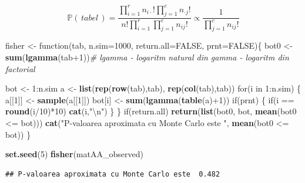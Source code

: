 \documentclass[]{article}
\newenvironment{Shaded}{\begin{snugshade}}{\end{snugshade}}
\newcommand{\KeywordTok}[1]{\textcolor[rgb]{0.13,0.29,0.53}{\textbf{{#1}}}}
\newcommand{\DataTypeTok}[1]{\textcolor[rgb]{0.13,0.29,0.53}{{#1}}}
\newcommand{\DecValTok}[1]{\textcolor[rgb]{0.00,0.00,0.81}{{#1}}}
\newcommand{\CharTok}[1]{\textcolor[rgb]{0.31,0.60,0.02}{{#1}}}
\newcommand{\StringTok}[1]{\textcolor[rgb]{0.31,0.60,0.02}{{#1}}}
\newcommand{\CommentTok}[1]{\textcolor[rgb]{0.56,0.35,0.01}{\textit{{#1}}}}
\newcommand{\OtherTok}[1]{\textcolor[rgb]{0.56,0.35,0.01}{{#1}}}
\newcommand{\NormalTok}[1]{{#1}}
\begin{document}
\[
  \mathbb{P}(\,tabel\,) = \frac{\prod_{i=1}^{r}n_{i\cdot}!\prod_{j=1}^{c}n_{\cdot j}!}{n!\prod_{i=1}^{r}\prod_{j=1}^{c}n_{ij}!}\propto\frac{1}{\prod_{j=1}^{c}n_{ij}!}
\]

\begin{Shaded}
\begin{Highlighting}[]
\NormalTok{fisher <-}\StringTok{ }\NormalTok{function(tab, }\DataTypeTok{n.sim=}\DecValTok{1000}\NormalTok{, }\DataTypeTok{return.all=}\OtherTok{FALSE}\NormalTok{, }\DataTypeTok{prnt=}\OtherTok{FALSE}\NormalTok{)\{}
  \NormalTok{bot0 <-}\StringTok{ }\KeywordTok{sum}\NormalTok{(}\KeywordTok{lgamma}\NormalTok{(tab}\DecValTok{+1}\NormalTok{))}\CommentTok{# lgamma - logaritm natural din gamma - logaritm din factorial}

  \NormalTok{bot <-}\StringTok{ }\DecValTok{1}\NormalTok{:n.sim}
  \NormalTok{a <-}\StringTok{ }\KeywordTok{list}\NormalTok{(}\KeywordTok{rep}\NormalTok{(}\KeywordTok{row}\NormalTok{(tab),tab), }\KeywordTok{rep}\NormalTok{(}\KeywordTok{col}\NormalTok{(tab),tab))}
  \NormalTok{for(i in }\DecValTok{1}\NormalTok{:n.sim) \{}
    \NormalTok{a[[}\DecValTok{1}\NormalTok{]] <-}\StringTok{ }\KeywordTok{sample}\NormalTok{(a[[}\DecValTok{1}\NormalTok{]])}
    \NormalTok{bot[i] <-}\StringTok{ }\KeywordTok{sum}\NormalTok{(}\KeywordTok{lgamma}\NormalTok{(}\KeywordTok{table}\NormalTok{(a)+}\DecValTok{1}\NormalTok{))}
    \NormalTok{if(prnt) \{ if(i ==}\StringTok{ }\KeywordTok{round}\NormalTok{(i/}\DecValTok{10}\NormalTok{)*}\DecValTok{10}\NormalTok{) }\KeywordTok{cat}\NormalTok{(i,}\StringTok{"}\CharTok{\textbackslash{}n}\StringTok{"}\NormalTok{) \}}
  \NormalTok{\}}
  \NormalTok{if(return.all) }\KeywordTok{return}\NormalTok{(}\KeywordTok{list}\NormalTok{(bot0, bot, }\KeywordTok{mean}\NormalTok{(bot0 <=}\StringTok{ }\NormalTok{bot)))}
  \KeywordTok{cat}\NormalTok{(}\StringTok{"P-valoarea aproximata cu Monte Carlo este "}\NormalTok{, }\KeywordTok{mean}\NormalTok{(bot0 <=}\StringTok{ }\NormalTok{bot))}
\NormalTok{\}}

\KeywordTok{set.seed}\NormalTok{(}\DecValTok{5}\NormalTok{)}
\KeywordTok{fisher}\NormalTok{(matAA_observed)}
\end{Highlighting}
\end{Shaded}

\begin{verbatim}
## P-valoarea aproximata cu Monte Carlo este  0.482
\end{verbatim}
\end{document}

